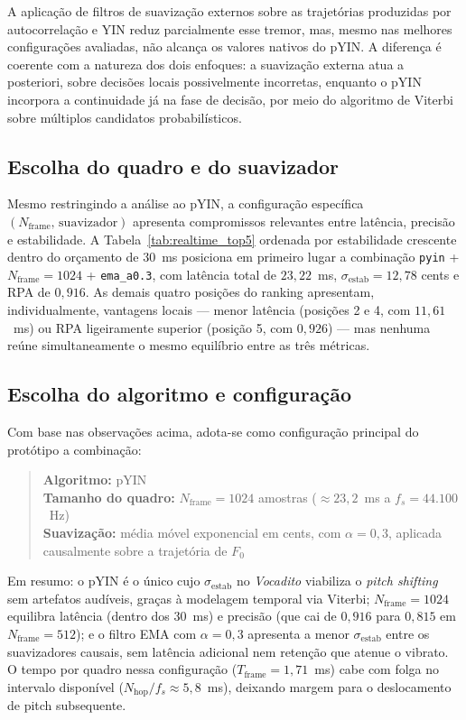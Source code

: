   A aplicação de filtros de suavização externos sobre as trajetórias produzidas
  por autocorrelação e YIN reduz parcialmente esse tremor, mas, mesmo nas
  melhores configurações avaliadas, não alcança os valores nativos do pYIN.
  A diferença é coerente com a natureza dos dois enfoques: a suavização
  externa atua a posteriori, sobre decisões locais possivelmente incorretas,
  enquanto o pYIN incorpora a continuidade já na fase de decisão, por meio do
  algoritmo de Viterbi sobre múltiplos candidatos probabilísticos.

  \subsection{Escolha do quadro e do suavizador}

  Mesmo restringindo a análise ao pYIN, a configuração específica
  $(N_{\text{frame}},\, \text{suavizador})$ apresenta compromissos relevantes
  entre latência, precisão e estabilidade. A Tabela~\ref{tab:realtime_top5}
  ordenada por estabilidade crescente dentro do orçamento de 30~ms posiciona
  em primeiro lugar a combinação \texttt{pyin} +
  $N_{\text{frame}} = 1024$ + \texttt{ema\_a0.3}, com latência total de
  $23{,}22$~ms, $\sigma_{\text{estab}} = 12{,}78$ cents e RPA de $0{,}916$.
  As demais quatro posições do ranking apresentam, individualmente, vantagens
  locais — menor latência (posições 2 e 4, com $11{,}61$~ms) ou RPA ligeiramente
  superior (posição 5, com $0{,}926$) — mas nenhuma reúne simultaneamente o
  mesmo equilíbrio entre as três métricas.

  \subsection{Escolha do algoritmo e configuração}

  Com base nas observações acima, adota-se como configuração principal do
  protótipo a combinação:

  \begin{quote}
  \textbf{Algoritmo:} pYIN \\
  \textbf{Tamanho do quadro:} $N_{\text{frame}} = 1024$ amostras
  ($\approx 23{,}2$~ms a $f_s = 44{.}100$~Hz) \\
  \textbf{Suavização:} média móvel exponencial em cents, com $\alpha = 0{,}3$,
  aplicada causalmente sobre a trajetória de $F_0$
  \end{quote}

  Em resumo: o pYIN é o único cujo $\sigma_{\text{estab}}$ no \textit{Vocadito}
  viabiliza o \textit{pitch shifting} sem artefatos audíveis, graças à modelagem
  temporal via Viterbi; $N_{\text{frame}} = 1024$ equilibra latência (dentro dos
  30~ms) e precisão (que cai de $0{,}916$ para $0{,}815$ em
  $N_{\text{frame}} = 512$); e o filtro EMA com $\alpha = 0{,}3$ apresenta a
  menor $\sigma_{\text{estab}}$ entre os suavizadores causais, sem latência
  adicional nem retenção que atenue o vibrato. O tempo por quadro nessa
  configuração ($T_{\text{frame}} = 1{,}71$~ms) cabe com folga no intervalo
  disponível ($N_{\text{hop}}/f_s \approx 5{,}8$~ms), deixando margem para o
  deslocamento de pitch subsequente.

